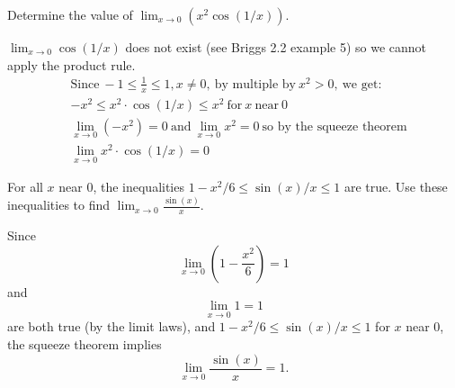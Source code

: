 \documentclass[nooutcomes,handout]{ximera}
\begin{document}
\begin{problem}


  Determine the value of $\lim_{x \to 0} (x^2 \cos(1/x))$.
  \begin{freeResponse}
	$\lim_{x \to 0} \cos(1/x)$ does not exist (see Briggs 2.2 example 5) so we cannot apply the product rule.
	\begin{align*}    
		&\text{Since}\ -1\le \frac{1}{x} \le 1, x\ne 0,\ \text{by multiple by}\ x^2>0,\ \text{we get:}\\
		&-x^2 \le x^2 \cdot \cos(1/x) \le x^2\ \text{for}\ x\ \text{near}\ 0\\
		 &\lim_{x \to 0} (-x^2) = 0\ \text{and}\ \lim_{x \to 0} x^2 = 0\ \text{so by the squeeze theorem}\\
    		&\lim_{x \to 0} x^2 \cdot \cos(1/x) = 0
	\end{align*}
  \end{freeResponse}

\end{problem}
	
	
	
	
	
	
\begin{problem}
 For all $x$ near 0, the inequalities $1 - x^2/6 \le \sin(x)/x \le 1$ are true.
  Use these inequalities to find $\displaystyle\lim_{x \to 0} \frac{\sin(x)}{x}$.
  \begin{freeResponse}
    Since
    \[
      \lim_{x \to 0} \left(1 - \frac{x^2}{6}\right) = 1
    \]
    and
    \[
     \lim_{x \to 0} 1 = 1
    \]
    are both true (by the limit laws), and $1 - x^2/6 \le \sin(x)/x \le 1$ for $x$ near 0, the squeeze theorem implies
    \[
     \lim_{x \to 0} \frac{\sin(x)}{x} = 1.
    \]


  \end{freeResponse}



\end{problem}
	
\end{document}
